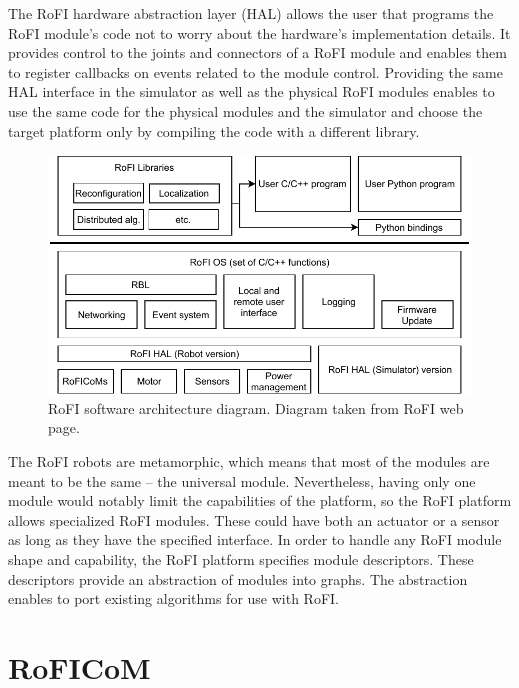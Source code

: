 \documentclass[
  printed, %
  color,   %
  notable, %
  oneside, %
  nolof,   %
  nolot,   %
  nocover,
]{fithesis3}
\begin{document}
The RoFI hardware abstraction layer (HAL)\label{hal} allows the user that programs the RoFI module's code not to worry about the hardware's implementation details.
It provides control to the joints and connectors of a RoFI module and enables them to register callbacks on events related to the module control.
Providing the same HAL interface in the simulator as well as the physical RoFI modules enables to use the same code for the physical modules and the simulator and choose the target platform only by compiling the code with a different library.


\begin{figure}
    \centering
    \includegraphics[width=\linewidth]{data/rofi_architecture.pdf}
    \caption{RoFI software architecture diagram. Diagram taken from RoFI web page\cite{rofi-web}.}
    \label{fig:architecture}
\end{figure}

The RoFI robots are metamorphic, which means that most of the modules are meant to be the same -- the universal module.
Nevertheless, having only one module would notably limit the capabilities of the platform, so the RoFI platform allows specialized RoFI modules.
These could have both an actuator or a sensor as long as they have the specified interface.
In order to handle any RoFI module shape and capability, the RoFI platform specifies module descriptors\cite{rofi-thesis}.
These descriptors provide an abstraction of modules into graphs. The abstraction enables to port existing algorithms for use with RoFI.

\section{RoFICoM}
\label{roficom}
\end{document}
